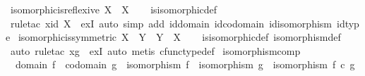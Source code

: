 \begin{isabellebody}
\endisatagproof
{\isafoldproof}%
%
\isadelimproof
\isanewline
%
\endisadelimproof
\isanewline
{}\isamarkupfalse%
\ isomorphic{\isacharunderscore}{\kern0pt}is{\isacharunderscore}{\kern0pt}reflexive{\isacharcolon}{\kern0pt}\ {\isachardoublequoteopen}X\ {\isasymcong}\ X{\isachardoublequoteclose}\isanewline
%
\isadelimproof
\ \ %
\endisadelimproof
%
\isatagproof
{}\isamarkupfalse%
\ is{\isacharunderscore}{\kern0pt}isomorphic{\isacharunderscore}{\kern0pt}def\isanewline
\ \ \isamarkupfalse%
\ {\isacharparenleft}{\kern0pt}rule{\isacharunderscore}{\kern0pt}tac\ x{\isacharequal}{\kern0pt}{\isachardoublequoteopen}id\ X{\isachardoublequoteclose}\ \ exI{\isacharcomma}{\kern0pt}\ auto\ simp\ add{\isacharcolon}{\kern0pt}\ id{\isacharunderscore}{\kern0pt}domain\ id{\isacharunderscore}{\kern0pt}codomain\ id{\isacharunderscore}{\kern0pt}isomorphism\ id{\isacharunderscore}{\kern0pt}type{\isacharparenright}{\kern0pt}%
\endisatagproof
{\isafoldproof}%
%
\isadelimproof
\isanewline
%
\endisadelimproof
\isanewline
{}\isamarkupfalse%
\ isomorphic{\isacharunderscore}{\kern0pt}is{\isacharunderscore}{\kern0pt}symmetric{\isacharcolon}{\kern0pt}\ {\isachardoublequoteopen}X\ {\isasymcong}\ Y\ {\isasymlongrightarrow}\ Y\ {\isasymcong}\ X{\isachardoublequoteclose}\isanewline
%
\isadelimproof
\ \ %
\endisadelimproof
%
\isatagproof
{}\isamarkupfalse%
\ is{\isacharunderscore}{\kern0pt}isomorphic{\isacharunderscore}{\kern0pt}def\ isomorphism{\isacharunderscore}{\kern0pt}def\ \isanewline
\ \ \isamarkupfalse%
\ {\isacharparenleft}{\kern0pt}auto{\isacharcomma}{\kern0pt}\ rule{\isacharunderscore}{\kern0pt}tac\ x{\isacharequal}{\kern0pt}{\isachardoublequoteopen}g{\isachardoublequoteclose}\ \ exI{\isacharcomma}{\kern0pt}\ auto{\isacharcomma}{\kern0pt}\ metis\ cfunc{\isacharunderscore}{\kern0pt}type{\isacharunderscore}{\kern0pt}def{\isacharparenright}{\kern0pt}%
\endisatagproof
{\isafoldproof}%
%
\isadelimproof
\isanewline
%
\endisadelimproof
\isanewline
{}\isamarkupfalse%
\ isomorphism{\isacharunderscore}{\kern0pt}comp{\isacharcolon}{\kern0pt}\ \isanewline
\ \ {\isachardoublequoteopen}domain\ f\ {\isacharequal}{\kern0pt}\ codomain\ g\ {\isasymLongrightarrow}\ isomorphism\ f\ {\isasymLongrightarrow}\ isomorphism\ g\ {\isasymLongrightarrow}\ isomorphism\ {\isacharparenleft}{\kern0pt}f\ {\isasymcirc}\isactrlsub c\ g{\isacharparenright}{\kern0pt}{\isachardoublequoteclose}\isanewline
%
\isadelimproof
\ \ %
\endisadelimproof
%
\isatagproof
{}\isamarkupfalse%

\end{isabellebody}
